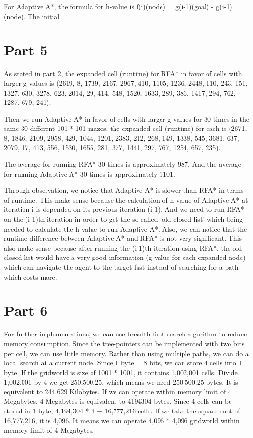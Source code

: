 \documentclass{article}
\begin{document}
For Adaptive A*, the formula for h-value is f{\tiny (i)}(node) = g{\tiny (i-1)}(goal) - g{\tiny (i-1)}(node). The initial 

\section*{Part 5}
\hspace{5mm}
As stated in part 2, the expanded cell (runtime) for RFA* in favor of cells with larger g-values is
(2619, 8, 1739, 2167, 2967, 410, 1105, 1236, 2448, 110, 243, 151, 1327, 630, 3278, 623, 2014, 29, 414, 548, 1520, 1633, 289, 386, 1417, 294, 762, 1287, 679, 241).

Then we run Adaptive A* in favor of cells with larger g-values for 30 times in the same 30 different 101 * 101 mazes. the expanded cell (runtime) for each is
(2671, 8, 1846, 2109, 2958, 429, 1044, 1201, 2383, 212, 268, 149, 1338, 545, 3681, 637, 2079, 17, 413, 556, 1530, 1655, 281, 377, 1441, 297, 767, 1254, 657, 235).

The average for running RFA* 30 times is approximately 987. And the average for running Adaptive A* 30 times is approximately 1101.

Through observation, we notice that Adaptive A* is slower than RFA* in terms of runtime. This make sense because the calculation of h-value of Adaptive A* at iteration i is depended on its previous iteration (i-1). And we need to run RFA* on the (i-1)th iteration in order to get the so called 'old closed list' which being needed to calculate the h-value to run Adaptive A*. Also, we can notice that the runtime difference between Adaptive A* and RFA* is not very significant. This also make sense because after running the (i-1)th iteration using RFA*, the old closed list would have a very good information (g-value for each expanded node) which can navigate the agent to the target fast instead of searching for a path which costs more.

\section*{Part 6}
\hspace{5mm}
For further implementations, we can use breadth first search algorithm to reduce memory consumption. Since the tree-pointers can be implemented with two bits per cell, we can use little memory.  Rather than using multiple paths, we can do a local search at a current node. Since 1 byte = 8 bits, we can store 4 cells into 1 byte. If the gridworld is size of 1001 * 1001, it contains 1,002,001 cells. Divide 1,002,001 by 4 we get 250,500.25, which means we need 250,500.25 bytes. It is equivalent to 244.629 Kilobytes. If we can operate within memory limit of 4 Megabytes, 4 Megabytes is equivalent to 4194304 bytes. Since 4 cells can be stored in 1 byte, 4,194,304 * 4 = 16,777,216 cells. If we take the square root of 16,777,216, it is 4,096. It means we can operate 4,096 * 4,096 gridworld within memory limit of 4 Megabytes.
\end{document}
